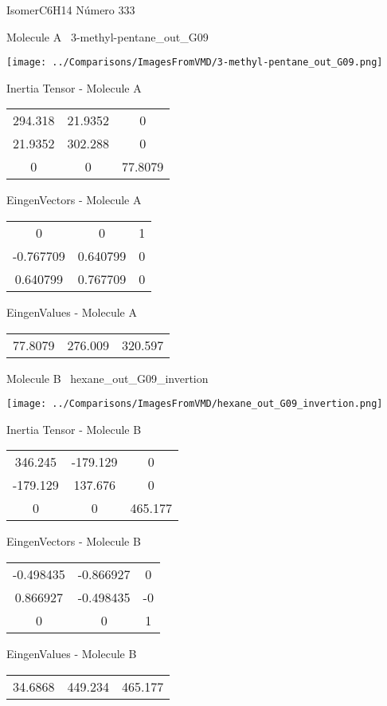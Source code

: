 \vtab[-3cm]
\begin{center}
{\large IsomerC6H14 \tab Número 333}
\end{center}
\begin{multicols}{2}
\begin{center}

Molecule A \
3-methyl-pentane\_out\_G09

\texttt{[image: ../Comparisons/ImagesFromVMD/3-methyl-pentane\_out\_G09.png]}

Inertia Tensor - Molecule A \\
\begin{tabular}{|c c c|}
294.318	 & 	21.9352	 & 	0	 \\
21.9352	 & 	302.288	 & 	0	 \\
0	 & 	0	 & 	77.8079
\end{tabular}

\vtab
 EingenVectors - Molecule A     \\
\begin{tabular}{|c c c|}
0	 & 	0	 & 	1	 \\
-0.767709	 & 	0.640799	 & 	0	 \\
0.640799	 & 	0.767709	 & 	0
\end{tabular}

\vtab
 EingenValues - Molecule A     \\
\begin{tabular}{|c c c|}
77.8079	 & 	276.009	 & 	320.597	 \\
\end{tabular}
\columnbreak

Molecule B \
hexane\_out\_G09\_invertion

\texttt{[image: ../Comparisons/ImagesFromVMD/hexane\_out\_G09\_invertion.png]}

Inertia Tensor - Molecule B \\
\begin{tabular}{|c c c|}
346.245	 & 	-179.129	 & 	0	 \\
-179.129	 & 	137.676	 & 	0	 \\
0	 & 	0	 & 	465.177
\end{tabular}

\vtab
 EingenVectors - Molecule B     \\
\begin{tabular}{|c c c|}
-0.498435	 & 	-0.866927	 & 	0	 \\
0.866927	 & 	-0.498435	 & 	-0	 \\
0	 & 	0	 & 	1
\end{tabular}

\vtab
 EingenValues - Molecule B     \\
\begin{tabular}{|c c c|}
34.6868	 & 	449.234	 & 	465.177	 \\
\end{tabular}

\end{center}
\end{multicols}

